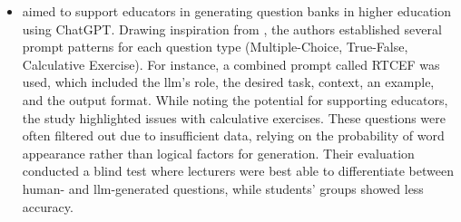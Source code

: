 \begin{itemize}
    \vspace{9em}\pagebreak
    \item \cite{vu_chatgpt-based_2024} aimed to support educators in generating question banks in higher education using ChatGPT. Drawing inspiration from \cite{cavojsky_exploring_2023}, the authors established several prompt patterns for each question type (Multiple-Choice, True-False, Calculative Exercise). For instance, a combined prompt called RTCEF was used, which included the \ac{llm}'s role, the desired task, context, an example, and the output format. While noting the potential for supporting educators, the study highlighted issues with calculative exercises. These questions were often filtered out due to insufficient data, relying on the probability of word appearance rather than logical factors for generation. Their evaluation conducted a blind test where lecturers were best able to differentiate between human- and \ac{llm}-generated questions, while students' groups showed less accuracy.
\end{itemize}

